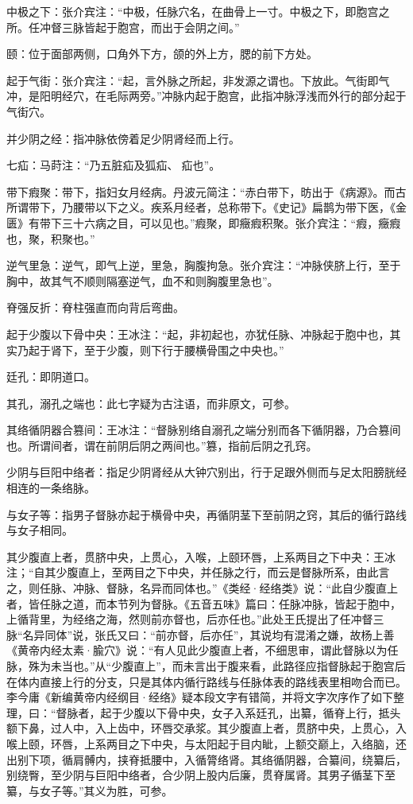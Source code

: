 \documentclass[12pt]{ctexbook}%
\begin{document}
\begin{jiaozhu}
	\item 中极之下：张介宾注：“中极，任脉穴名，在曲骨上一寸。中极之下，即胞宫之所。任冲督三脉皆起于胞宫，而出于会阴之间。”
	\item 颐：位于面部两侧，口角外下方，颌的外上方，腮的前下方处。
	\item 起于气街：张介宾注：“起，言外脉之所起，非发源之谓也。下放此。气街即气冲，是阳明经穴，在毛际两旁。”冲脉内起于胞宫，此指冲脉浮浅而外行的部分起于气街穴。
	\item 并少阴之经：指冲脉依傍着足少阴肾经而上行。
	\item 七疝：马莳注：“乃五脏疝及狐疝、𤻊疝也”。
	\item 带下瘕聚：带下，指妇女月经病。丹波元简注：“赤白带下，昉出于《病源》。而古所谓带下，乃腰带以下之义。疾系月经者，总称带下。《史记》扁鹊为带下医，《金匮》有带下三十六病之目，可以见也。”瘕聚，即癥瘕积聚。张介宾注：“瘕，癥瘕也，聚，积聚也。”
	\item 逆气里急：逆气，即气上逆，里急，胸腹拘急。张介宾注：“冲脉侠脐上行，至于胸中，故其气不顺则隔塞逆气，血不和则胸腹里急也”。
	\item 脊强反折：脊柱强直而向背后弯曲。
	\item 起于少腹以下骨中央：王冰注：“起，非初起也，亦犹任脉、冲脉起于胞中也，其实乃起于肾下，至于少腹，则下行于腰横骨围之中央也。”
	\item 廷孔：即阴道口。
	\item 其孔，溺孔之端也：此七字疑为古注语，而非原文，可参。
	\item 其络循阴器合篡间：王冰注：“督脉别络自溺孔之端分别而各下循阴器，乃合篡间也。所谓间者，谓在前阴后阴之两间也。”篡，指前后阴之孔窍。
	\item 少阴与巨阳中络者：指足少阴肾经从大钟穴别出，行于足跟外侧而与足太阳膀胱经相连的一条络脉。
	\item 与女子等：指男子督脉亦起于横骨中央，再循阴茎下至前阴之窍，其后的循行路线与女子相同。
	\item 其少腹直上者，贯脐中央，上贯心，入喉，上颐环唇，上系两目之下中夬：王冰注；“自其少腹直上，至两目之下中央，并任脉之行，而云是督脉所系，由此言之，则任脉、冲脉、督脉，名异而同体也。”《类经·经络类》说：“此自少腹直上者，皆任脉之道，而本节列为督脉。《五音五味》篇曰：任脉冲脉，皆起于胞中，上循背里，为经络之海，然则前亦督也，后亦任也。”此处王氏提出了任冲督三脉“名异同体”说，张氏又曰：“前亦督，后亦任”，其说均有混淆之嫌，故杨上善《黄帝内经太素·腧穴》说：“有人见此少腹直上者，不细思审，谓此督脉以为任脉，殊为未当也。”从“少腹直上”，而未言出于腹来看，此路径应指督脉起于胞宫后在体内直接上行的分支，只是其体内循行路线与任脉体表的路线表里相吻合而已。李今庸《新编黄帝内经纲目·经络》疑本段文字有错简，并将文字次序作了如下整理，曰：“督脉者，起于少腹以下骨中央，女子入系廷孔，出纂，循脊上行，抵头额下鼻，过人中，入上齿中，环唇交承浆。其少腹直上者，贯脐中央，上贯心，入喉上颐，环唇，上系两目之下中央，与太阳起于目内眦，上额交巅上，入络脑，还出别下项，循肩髆内，挟脊抵腰中，入循膂络肾。其络循阴器，合纂间，绕纂后，别绕臀，至少阴与巨阳中络者，合少阴上股内后廉，贯脊属肾。其男子循茎下至纂，与女子等。”其义为胜，可参。

\end{jiaozhu}
\end{document}
